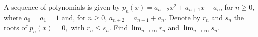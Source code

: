 A sequence of polynomials is given by $p_{n}(x)=a_{n+2}x^{2}+a_{n+1}x-a_{n}$,
for $n\ge0$, where $a_{0}=a_{1}=1$ and, for $n\ge0$, $a_{n+2}=a_{n+1}+a_{n}$.
Denote by $r_{n}$ and $s_{n}$ the roots of $p_{n}(x)=0,$ with $r_{n}\le s_{n}$.
Find $\displaystyle{\lim_{n \to \infty} r_n}$ and $\displaystyle{\lim_{n \to \infty} s_n}$.
